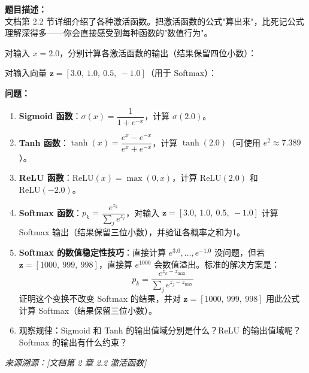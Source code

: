 \documentclass[a4paper,11pt]{ctexart}
\begin{document}
\begin{problembox}
    \textbf{题目描述：}\\
    文档第 2.2 节详细介绍了各种激活函数。把激活函数的公式"算出来"，比死记公式理解深得多——你会直接感受到每种函数的"数值行为"。

    \vspace{0.3cm}
    对输入 $x = 2.0$，分别计算各激活函数的输出（结果保留四位小数）：

    \vspace{0.3cm}
    对输入向量 $\mathbf{z} = [3.0,\ 1.0,\ 0.5,\ -1.0]$（用于 Softmax）：

    \vspace{0.3cm}
    \textbf{问题：}
    \begin{enumerate}[(1)]
        \item \textbf{Sigmoid 函数}：$\sigma(x) = \dfrac{1}{1+e^{-x}}$，计算 $\sigma(2.0)$。

        \item \textbf{Tanh 函数}：$\tanh(x) = \dfrac{e^x - e^{-x}}{e^x + e^{-x}}$，计算 $\tanh(2.0)$（可使用 $e^2 \approx 7.389$）。

        \item \textbf{ReLU 函数}：$\text{ReLU}(x) = \max(0, x)$，计算 $\text{ReLU}(2.0)$ 和 $\text{ReLU}(-2.0)$。

        \item \textbf{Softmax 函数}：$p_k = \dfrac{e^{z_k}}{\sum_j e^{z_j}}$，对输入 $\mathbf{z} = [3.0,\ 1.0,\ 0.5,\ -1.0]$ 计算 Softmax 输出（结果保留三位小数），并验证各概率之和为1。

        \item \textbf{Softmax 的数值稳定性技巧}：直接计算 $e^{3.0},\ldots,e^{-1.0}$ 没问题，但若 $\mathbf{z} = [1000,\ 999,\ 998]$，直接算 $e^{1000}$ 会数值溢出。标准的解决方案是：
        \[
        p_k = \frac{e^{z_k - z_{\max}}}{\sum_j e^{z_j - z_{\max}}}
        \]
        证明这个变换不改变 Softmax 的结果，并对 $\mathbf{z} = [1000,\ 999,\ 998]$ 用此公式计算 Softmax（结果保留三位小数）。

        \item 观察规律：Sigmoid 和 Tanh 的输出值域分别是什么？ReLU 的输出值域呢？Softmax 的输出有什么约束？
    \end{enumerate}

    \vspace{0.2cm}
    {\color{gray}\small\textit{来源溯源：[文档第 2 章 2.2 激活函数]}}
\end{problembox}
\end{document}
